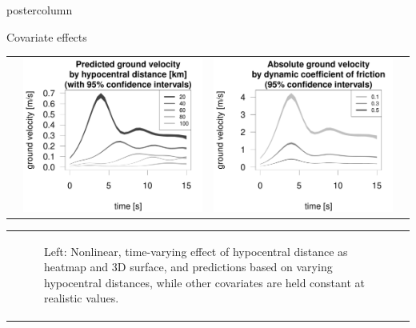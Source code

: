 \documentclass[final,hyperref={pdfpagelabels=false}]{beamer}
\newcommand*\circled[1]{\tikz[baseline=(char.base)]{
\node[shape=circle,draw,inner sep=2pt] (char) {#1};}}
\begin{document}
\begin{frame}
\begin{columns}
\begin{column}{1\textwidth}
\begin{columns}[T]
\begin{column}{.484\textwidth}
\begin{beamercolorbox}[center,wd=\textwidth]{postercolumn}
\begin{minipage}[T]{.95\textwidth}
\begin{block}{\footnotesize \circled{2} Covariate effects}
\begin{tabularx}{.95\textwidth}{ZZZ!{\color{LMUdarkgray}\vrule{}}Z}
&
\includegraphics[width=.9\linewidth]{figures/Effekte_hypoDis3.pdf}
&
\includegraphics[width=.9\linewidth]{figures/Effekte_md1.pdf}
\\
\end{tabularx}
\vspace{-3.5ex}
\begin{center}
\begin{tabularx}{.97\textwidth}{Z}
\begin{figure}[!ht]\centering
\caption{\footnotesize Left: Nonlinear, time-varying effect of hypocentral distance as heatmap and 3D surface, and predictions based on varying hypocentral distances, while other covariates are held constant at realistic values.
}
\end{figure}
\end{tabularx}
\end{center}
\end{block}
\end{minipage}
\end{beamercolorbox}
\end{column}
\end{columns}
\end{column}
\end{columns}
\end{frame}
\end{document}
